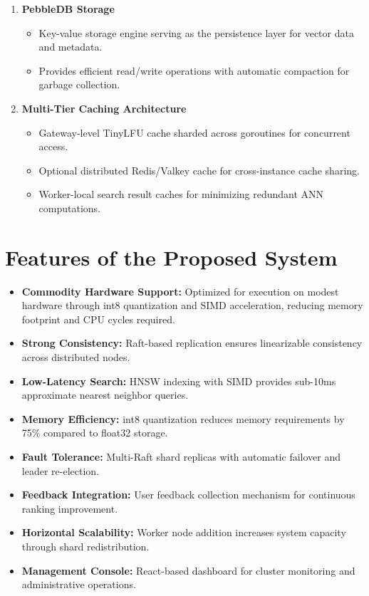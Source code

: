 \begin{enumerate}
    \item \textbf{PebbleDB Storage}
    \begin{itemize}
        \item Key-value storage engine serving as the persistence layer for vector data and metadata.
        \item Provides efficient read/write operations with automatic compaction for garbage collection.
    \end{itemize}

    \item \textbf{Multi-Tier Caching Architecture}
    \begin{itemize}
        \item Gateway-level TinyLFU cache sharded across goroutines for concurrent access.
        \item Optional distributed Redis/Valkey cache for cross-instance cache sharing.
        \item Worker-local search result caches for minimizing redundant ANN computations.
    \end{itemize}
\end{enumerate}

\section{Features of the Proposed System}
\begin{itemize}
    \item \textbf{Commodity Hardware Support:} Optimized for execution on modest hardware through int8 quantization and SIMD acceleration, reducing memory footprint and CPU cycles required.
    \item \textbf{Strong Consistency:} Raft-based replication ensures linearizable consistency across distributed nodes.
    \item \textbf{Low-Latency Search:} HNSW indexing with SIMD provides sub-10ms approximate nearest neighbor queries.
    \item \textbf{Memory Efficiency:} int8 quantization reduces memory requirements by 75\% compared to float32 storage.
    \item \textbf{Fault Tolerance:} Multi-Raft shard replicas with automatic failover and leader re-election.
    \item \textbf{Feedback Integration:} User feedback collection mechanism for continuous ranking improvement.
    \item \textbf{Horizontal Scalability:} Worker node addition increases system capacity through shard redistribution.
    \item \textbf{Management Console:} React-based dashboard for cluster monitoring and administrative operations.
\end{itemize}

